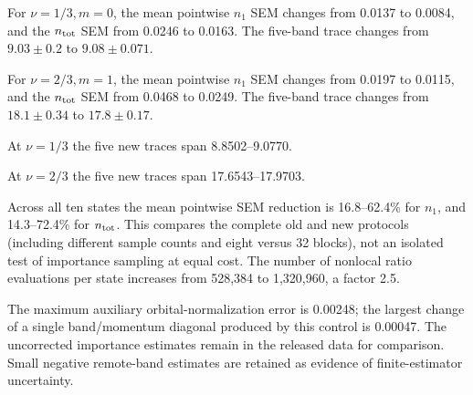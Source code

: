 For $\nu=1/3,m=0$, the mean pointwise $n_1$ SEM changes from 0.0137 to 0.0084, and the $n_{\rm tot}$ SEM from 0.0246 to 0.0163. The five-band trace changes from $9.03\mathbin{\pm}0.2$ to $9.08\mathbin{\pm}0.071$.

For $\nu=2/3,m=1$, the mean pointwise $n_1$ SEM changes from 0.0197 to 0.0115, and the $n_{\rm tot}$ SEM from 0.0468 to 0.0249. The five-band trace changes from $18.1\mathbin{\pm}0.34$ to $17.8\mathbin{\pm}0.17$.

At $\nu=1/3$ the five new traces span 8.8502--9.0770.

At $\nu=2/3$ the five new traces span 17.6543--17.9703.

Across all ten states the mean pointwise SEM reduction is 16.8--62.4\% for $n_1$, and 14.3--72.4\% for $n_{\rm tot}$. This compares the complete old and new protocols (including different sample counts and eight versus 32 blocks), not an isolated test of importance sampling at equal cost. The number of nonlocal ratio evaluations per state increases from 528,384 to 1,320,960, a factor 2.5.

The maximum auxiliary orbital-normalization error is 0.00248; the largest change of a single band/momentum diagonal produced by this control is 0.00047. The uncorrected importance estimates remain in the released data for comparison. Small negative remote-band estimates are retained as evidence of finite-estimator uncertainty.
